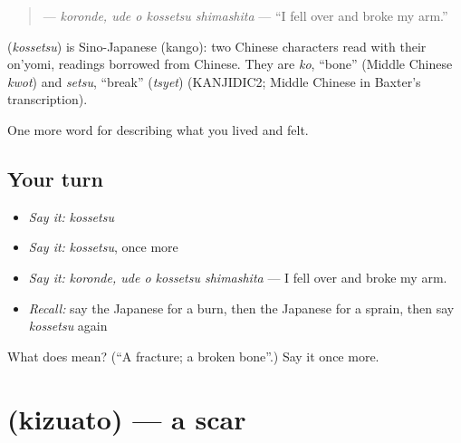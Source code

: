 \begin{quote}
\textbf{ } — \emph{koronde, ude o kossetsu shimashita} — \textquotedblleft{}I fell over and broke my arm.\textquotedblright{}
\end{quote}

\begin{cousinweb}
\textbf{} (\emph{kossetsu}) is Sino-Japanese (kango): two Chinese characters read with their on'yomi, readings borrowed from Chinese. They are \emph{ko}, \textquotedblleft{}bone\textquotedblright{} (Middle Chinese \emph{kwot}) and \emph{setsu}, \textquotedblleft{}break\textquotedblright{} (\emph{tsyet}) (KANJIDIC2; Middle Chinese in Baxter's transcription).
\end{cousinweb}

\begin{grammarlens}[title={What you've built}]
One more word for describing what you lived and felt.
\end{grammarlens}

\subsection*{Your turn}
\begin{itemize}
\raggedright
  \item \emph{Say it:} \emph{kossetsu}
  \item \emph{Say it:} \emph{kossetsu}, once more
  \item \emph{Say it:} \emph{koronde, ude o kossetsu shimashita} — I fell over and broke my arm.
  \item \emph{Recall:} say the Japanese for a burn, then the Japanese for a sprain, then say \emph{kossetsu} again
\end{itemize}

\begin{tcolorbox}[breakable,colback=teal!4,colframe=teal!35!black,title={Before you move on}]
What does  mean? (\textquotedblleft{}A fracture; a broken bone\textquotedblright{}.) Say it once more.
\end{tcolorbox}
\section[\texorpdfstring{\ja{きずあと} (kizuato)}{きずあと (kizuato)}]{ (kizuato) — a scar}

\label{lesson:JA-C449-kizuato}



